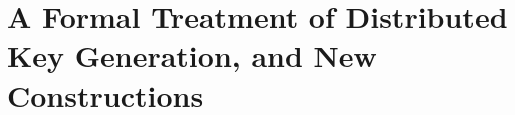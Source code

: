 \chapter{A Formal Treatment of Distributed Key Generation, and New Constructions}
\label{chp:storm}





















